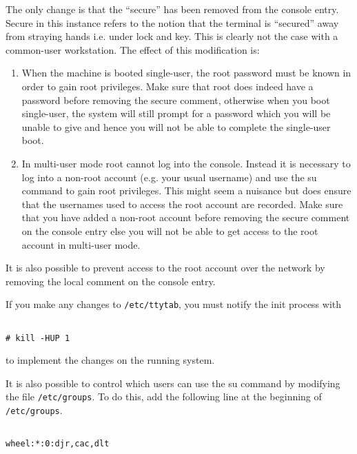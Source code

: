The only change is that the ``secure'' has been removed from the console
entry. Secure in this instance refers to the notion that the terminal is
``secured'' away from straying hands i.e. under lock and key. This is clearly
not the case with a common-user workstation. The effect of this
modification is:

\begin{enumerate}

\item When the machine is booted single-user, the root password must be known in
   order to gain root privileges. Make sure that root does indeed have
   a password before removing the secure comment, otherwise when you
   boot single-user, the system will still prompt for a password which
   you will be unable to give and hence you will not be able to
   complete the single-user boot.

\item In multi-user mode root cannot log into the console. Instead it is
   necessary to log into a non-root account (e.g. your usual username) and
   use the su command to gain root privileges. This might seem a nuisance
   but does ensure that the usernames used to access the root account
   are recorded. Make sure that you have  added a non-root account before
   removing the secure comment on the console entry else you will not be able to
   get access to the root account  in multi-user mode.

\end{enumerate}

It is also possible to prevent access to the root account over the network
by removing the local comment on the console entry.

If you make any changes to {\tt /etc/ttytab}, you must notify the init process with

\begin{verbatim}

# kill -HUP 1

\end{verbatim}

to implement the changes on the running system.

It is also possible to control which users can use the su command
by modifying the file {\tt /etc/groups}. To do this, add the following line
at the beginning of {\tt /etc/groups}.


\begin{verbatim}

wheel:*:0:djr,cac,dlt

\end{verbatim}


